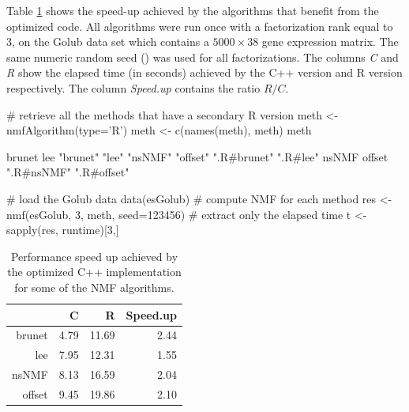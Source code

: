 \documentclass[a4paper]{article}
\begin{document}
Table \ref{tab:perf} shows the speed-up achieved by the algorithms that benefit from the optimized code.
All algorithms were run once with a factorization rank equal to 3, on the Golub data set which contains a $5000\times 38$ gene expression matrix. 
The same numeric random seed () was used for all factorizations.
The columns \emph{C} and \emph{R} show the elapsed time (in seconds) achieved by the C++ version and R version respectively.
The column \emph{Speed.up} contains the ratio $R/C$. 

\begin{Schunk}
\begin{Sinput}
 # retrieve all the methods that have a secondary R version
 meth <- nmfAlgorithm(type='R')
 meth <- c(names(meth), meth)
 meth
\end{Sinput}
\begin{Soutput}
                                                     brunet         lee 
   "brunet"       "lee"     "nsNMF"    "offset" ".R#brunet"    ".R#lee" 
      nsNMF      offset 
 ".R#nsNMF" ".R#offset" 
\end{Soutput}
\begin{Sinput}
 # load the Golub data
 data(esGolub)
 # compute NMF for each method
 res <- nmf(esGolub, 3, meth, seed=123456)
 # extract only the elapsed time
 t <- sapply(res, runtime)[3,]
\end{Sinput}
\end{Schunk}

\begin{table}[ht]
\begin{center}
\begin{tabular}{rrrr}
  \hline
 & C & R & Speed.up \\ 
  \hline
brunet & 4.79 & 11.69 & 2.44 \\ 
  lee & 7.95 & 12.31 & 1.55 \\ 
  nsNMF & 8.13 & 16.59 & 2.04 \\ 
  offset & 9.45 & 19.86 & 2.10 \\ 
   \hline
\end{tabular}
\caption{Performance speed up achieved by the optimized C++ implementation for some of the NMF algorithms.}
\label{tab:perf}
\end{center}
\end{table}

\end{document}
